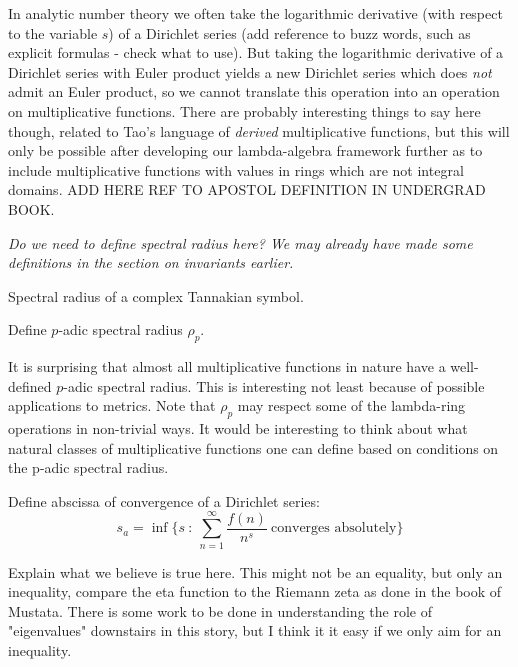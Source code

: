 
\begin{remark}
In analytic number theory we often take the logarithmic derivative (with respect to the variable $s$) of a Dirichlet series (add reference to buzz words, such as explicit formulas - check what to use). But taking the logarithmic derivative of a Dirichlet series with Euler product yields a new Dirichlet series which does \emph{not} admit an Euler product, so we cannot translate this operation into an operation on multiplicative functions. There are probably interesting things to say here though, related to Tao's language of \emph{derived} multiplicative functions, but this will only be possible after developing our lambda-algebra framework further as to include multiplicative functions with values in rings which are not integral domains. ADD HERE REF TO APOSTOL DEFINITION IN UNDERGRAD BOOK.
\end{remark}

\emph{Do we need to define spectral radius here? We may already have made some definitions in the section on invariants earlier.}

\begin{definition}
Spectral radius of a complex Tannakian symbol.
\end{definition}

\begin{definition}
Define $p$-adic spectral radius $\rho_p$.
\end{definition}

\begin{remark}
It is surprising that almost all multiplicative functions in nature have a well-defined $p$-adic spectral radius. This is interesting not least because of possible applications to metrics. Note that $\rho_p$ may respect some of the lambda-ring operations in non-trivial ways. It would be interesting to think about what natural classes of multiplicative functions one can define based on conditions on the p-adic spectral radius.
\end{remark}

\begin{definition}
Define abscissa of convergence of a Dirichlet series:
$$   s_a = \inf \{ s \ : \ \sum_{n=1}^{\infty} \frac{f(n)}{n^s} \ \textrm{converges absolutely}  \}  $$
\end{definition}

Explain what we believe is true here. This might not be an equality, but only an inequality, compare the eta function to the Riemann zeta as done in the book of Mustata. There is some work to be done in understanding the role of "eigenvalues" downstairs in this story, but I think it it easy if we only aim for an inequality.



